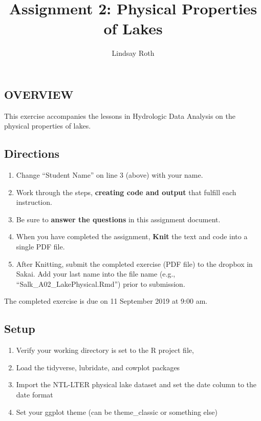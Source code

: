 \documentclass[]{article}
\title{Assignment 2: Physical Properties of Lakes}
\author{Lindsay Roth}
\date{}
\providecommand{\tightlist}{%
  \setlength{\itemsep}{0pt}\setlength{\parskip}{0pt}}
\begin{document}
\maketitle

\hypertarget{overview}{%
\subsection{OVERVIEW}\label{overview}}

This exercise accompanies the lessons in Hydrologic Data Analysis on the
physical properties of lakes.

\hypertarget{directions}{%
\subsection{Directions}\label{directions}}

\begin{enumerate}
\def\labelenumi{\arabic{enumi}.}
\tightlist
\item
  Change ``Student Name'' on line 3 (above) with your name.
\item
  Work through the steps, \textbf{creating code and output} that fulfill
  each instruction.
\item
  Be sure to \textbf{answer the questions} in this assignment document.
\item
  When you have completed the assignment, \textbf{Knit} the text and
  code into a single PDF file.
\item
  After Knitting, submit the completed exercise (PDF file) to the
  dropbox in Sakai. Add your last name into the file name (e.g.,
  ``Salk\_A02\_LakePhysical.Rmd'') prior to submission.
\end{enumerate}

The completed exercise is due on 11 September 2019 at 9:00 am.

\hypertarget{setup}{%
\subsection{Setup}\label{setup}}

\begin{enumerate}
\def\labelenumi{\arabic{enumi}.}
\tightlist
\item
  Verify your working directory is set to the R project file,
\item
  Load the tidyverse, lubridate, and cowplot packages
\item
  Import the NTL-LTER physical lake dataset and set the date column to
  the date format
\item
  Set your ggplot theme (can be theme\_classic or something else)
\end{enumerate}
\end{document}
